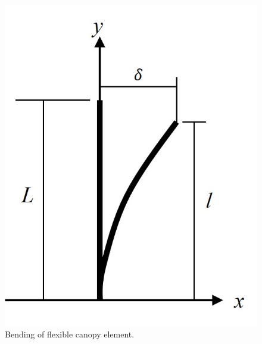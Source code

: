 \documentclass{jfm}
\begin{document}
\begin{figure}
  \centerline{\includegraphics{FIG/bendingModel.jpg}}
  \caption{Bending of flexible canopy element.}
\label{fig:bend}
\end{figure}









\end{document}
